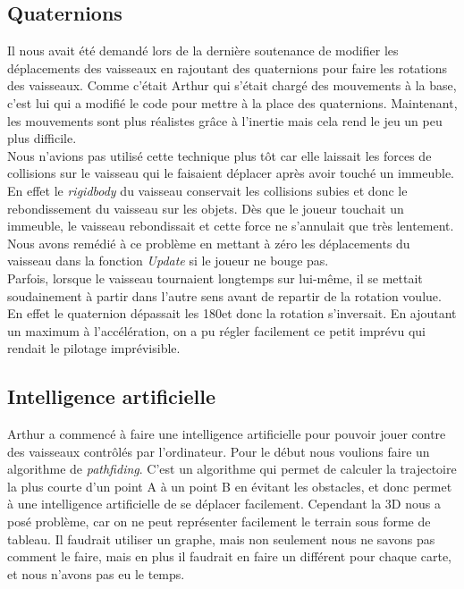 \documentclass[10pt, titlepage]{report}
\begin{document}
\subsection{Quaternions}
Il nous avait été demandé lors de la dernière soutenance de modifier les déplacements des vaisseaux en rajoutant des quaternions pour faire les rotations des vaisseaux. Comme c'était Arthur qui s'était chargé des mouvements à la base, c'est lui qui a modifié le code pour mettre à la place des quaternions. Maintenant, les mouvements sont plus réalistes grâce à l'inertie mais cela rend le jeu un peu plus difficile.\\

Nous n'avions pas utilisé cette technique plus tôt car elle laissait les forces de collisions sur le vaisseau qui le faisaient déplacer après avoir touché un immeuble. En effet le \textit{rigidbody} du vaisseau conservait les collisions subies et donc le rebondissement du vaisseau sur les objets. Dès que le joueur touchait un immeuble, le vaisseau rebondissait et cette force ne s'annulait que très lentement. Nous avons remédié à ce problème en mettant à zéro les déplacements du vaisseau dans la fonction \textit{Update} si le joueur ne bouge pas.\\

Parfois, lorsque le vaisseau tournaient longtemps sur lui-même, il se mettait soudainement à partir dans l'autre sens avant de repartir de la rotation voulue. En effet le quaternion dépassait les 180\textdegree  et donc la rotation s'inversait. En ajoutant un maximum à l'accélération, on a pu régler facilement ce petit imprévu qui rendait le pilotage imprévisible.\\

\subsection{Intelligence artificielle}

Arthur a commencé à faire une intelligence artificielle pour pouvoir jouer contre des vaisseaux contrôlés par l'ordinateur. Pour le début nous voulions faire un algorithme de \textit{pathfiding}. C'est un algorithme qui permet de calculer la trajectoire la plus courte d'un point A à un point B en évitant les obstacles, et donc permet à une intelligence artificielle de se déplacer facilement. Cependant la 3D nous a posé problème, car on ne peut représenter facilement le terrain sous forme de tableau. Il faudrait utiliser un graphe, mais non seulement nous ne savons pas comment le faire, mais en plus il faudrait en faire un différent pour chaque carte, et nous n'avons pas eu le temps.\\
\end{document}

